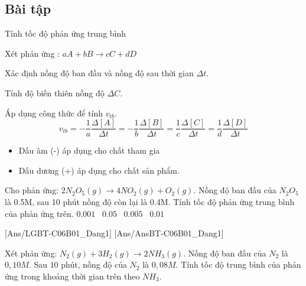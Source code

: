 \documentclass[Main.tex]{subfiles}
\begin{document}
	\subsection{Bài tập}
	\begin{dang}{Tính tốc độ phản ứng trung bình}
	\end{dang}
	\begin{phuongphap}
		Xét phản ứng : $aA + bB \rightarrow cC + dD$
		\begin{cacbuoc}
			\item Xác định nồng độ ban đầu và nồng độ sau thời gian $\Delta t$.
			\item Tính độ biến thiên nồng độ $\Delta C$.
			\item Áp dụng công thức để tính $v_{tb}$.
			\[v_{tb} = -\frac{1}{a}\frac{\Delta [A]}{\Delta t} = -\frac{1}{b}\frac{\Delta [B]}{\Delta t} = \frac{1}{c}\frac{\Delta [C]}{\Delta t} = \frac{1}{d}\frac{\Delta [D]}{\Delta t}\]
			\begin{itemize}
				\item Dấu âm (-) áp dụng cho chất tham gia
				\item Dấu dương (+) áp dụng cho chất sản phẩm.
			\end{itemize}
		\end{cacbuoc}
	\end{phuongphap}
	\begin{vd}
		Cho phản ứng: $2N_2O_5(g) \rightarrow 4NO_2(g) + O_2(g)$. Nồng độ ban đầu của $N_2O_5$ là 0.5M, sau 10 phút nồng độ còn lại là 0.4M. Tính tốc độ phản ứng trung bình của phản ứng trên.
		\choice
		{$0.001$ \, }
		{$0.05$ \, }
		{\True $0.005$ \, }
		{$0.01$ \, }
	\end{vd}
	
	
	[Ans/LGBT-C06B01_Dang1]
	[Ans/AnsBT-C06B01_Dang1]
	\begin{bt}
		Xét phản ứng: $N_2(g) + 3H_2(g) \rightarrow 2NH_3(g)$.
		Nồng độ ban đầu của $N_2$ là $0{,}10 M$. Sau $10$ phút, nồng độ của $N_2$ là $0{,}08 M$. Tính tốc độ trung bình của phản ứng trong khoảng thời gian trên theo $NH_3$.
	\end{bt}
	
\end{document}

